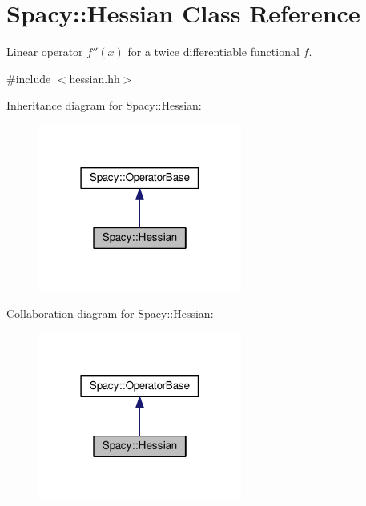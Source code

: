 \hypertarget{classSpacy_1_1Hessian}{}\section{Spacy\+:\+:Hessian Class Reference}
\label{classSpacy_1_1Hessian}


Linear operator $f''(x)$ for a twice differentiable functional $f$.  




{\ttfamily \#include $<$hessian.\+hh$>$}



Inheritance diagram for Spacy\+:\+:Hessian\+:\nopagebreak
\begin{figure}[H]
\begin{center}
\leavevmode
\includegraphics[width=190pt]{classSpacy_1_1Hessian__inherit__graph}
\end{center}
\end{figure}


Collaboration diagram for Spacy\+:\+:Hessian\+:\nopagebreak
\begin{figure}[H]
\begin{center}
\leavevmode
\includegraphics[width=190pt]{classSpacy_1_1Hessian__coll__graph}
\end{center}
\end{figure}
